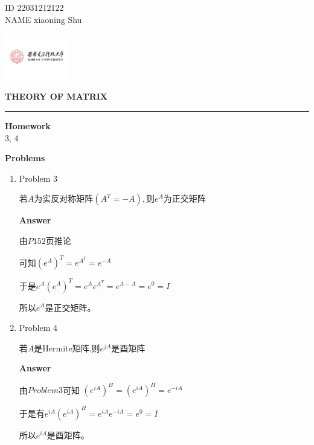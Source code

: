\documentclass[11pt,letterpaper]{ctexart}
\begin{document}
\pagestyle{plain}
\begin{flushleft}
ID 22031212122 \\
NAME xiaoning Shu\\
\end{flushleft}

\begin{flushright}\vspace{-18mm}
\includegraphics[height=2.0cm]{logo.png}
\end{flushright}
 
\begin{center}\vspace{-0.1cm}
\textbf{ \large THEORY OF MATRIX}\\
\end{center}

 
\rule{\linewidth}{0.1mm}

\bigskip
\textbf{\large{Homework}}
\\

{3, 4}



\bigskip
\textbf{\large{Problems}}

\begin{enumerate}

\item Problem 3%

若$A$为实反对称矩阵$(A^T = -A),$则$e^A$为正交矩阵

\bigskip
\textbf{\large{Answer}}

	由$P152$页推论

	可知$(e^A)^T = e^{A^T} = e^{-A}$

	于是$e^A(e^A)^T = e^Ae^{A^T} = e^{A - A} = e^0 = I$

	所以$e^A$是正交矩阵。



\item Problem 4%

若$A$是Hermite矩阵,则$e^{jA}$是酉矩阵

\bigskip
\textbf{\large{Answer}}

	由$Problem 3$可知 $(e^{iA})^H = (e^{iA})^H = e^{-iA}$

	于是有$e^{iA}(e^{iA})^H = e^{iA}e^{-iA} = e^0 = I$

	所以$e^{iA}$是酉矩阵。






\end{enumerate}
\end{document}

